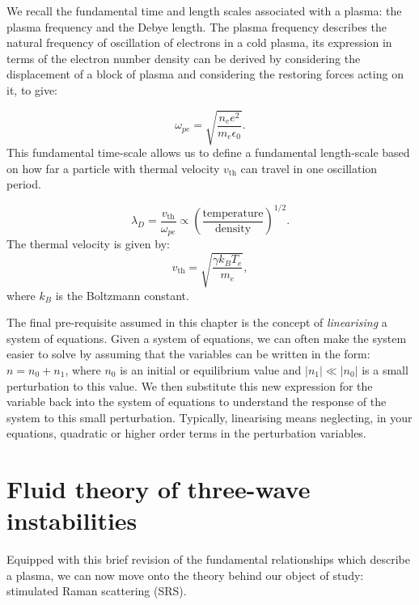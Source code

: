 We recall the fundamental time and length scales associated with a plasma: the plasma frequency and the Debye length. The plasma frequency describes the natural frequency of oscillation of electrons in a cold plasma, its expression in terms of the electron number density can be derived by considering the displacement of a block of plasma and considering the restoring forces acting on it, to give:

\begin{equation}
	\omega_{pe} = \sqrt{\frac{n_e e^2}{m_e \epsilon_0}}.
\end{equation} This fundamental time-scale allows us to define a fundamental length-scale based on how far a particle with thermal velocity $v_{\text{th}}$ can travel in one oscillation period.

\begin{equation}
	\lambda_D = \frac{v_{\mathrm{th}}}{\omega_{pe}} \propto \left(\frac{\mathrm{temperature}}{\mathrm{density}}\right)^{1/2}.
\end{equation}\label{eqn:debye} The thermal velocity is given by:
\begin{equation}
	v_{\text{th}} = \sqrt{\frac{\gamma k_BT_e}{m_e}},
\end{equation}\label{eqn:vth} where $k_B$ is the Boltzmann constant.

The final pre-requisite assumed in this chapter is the concept of \textit{linearising} a system of equations. Given a system of equations, we can often make the system easier to solve by assuming that the variables can be written in the form: $n = n_0 + n_1$, where $n_0$ is an initial or equilibrium value and $|n_1| \ll |n_0|$ is a small perturbation to this value. We then substitute this new expression for the variable back into the system of equations to understand the response of the system to this small perturbation. Typically, linearising means neglecting, in your equations, quadratic or higher order terms in the perturbation variables. 



\section{Fluid theory of three-wave instabilities}
Equipped with this brief revision of the fundamental relationships which describe a plasma, we can now move onto the theory behind our object of study: stimulated Raman scattering (\acrshort{SRS}).

